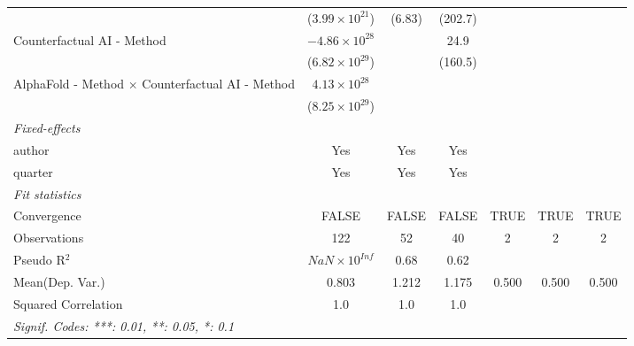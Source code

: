 \begin{tabular}{lcccccc}
                                                           & ($3.99\times 10^{21}$)  & (6.83)      & (202.7)      &      &      &   \\   
   Counterfactual AI - Method                              & $-4.86\times 10^{28}$   &             & 24.9         &      &      &   \\   
                                                           & ($6.82\times 10^{29}$)  &             & (160.5)      &      &      &   \\   
   AlphaFold - Method $\times$ Counterfactual AI - Method  & $4.13\times 10^{28}$    &             &              &      &      &   \\   
                                                           & ($8.25\times 10^{29}$)  &             &              &      &      &   \\   
   \midrule
   \emph{Fixed-effects}\\
   author                                                  & Yes                     & Yes         & Yes          &      &      & \\  
   quarter                                                 & Yes                     & Yes         & Yes          &      &      & \\  
   \midrule
   \emph{Fit statistics}\\
   Convergence                                             &FALSE                    & FALSE       & FALSE        & TRUE & TRUE & TRUE\\  
   Observations                                            & 122                     & 52          & 40           & 2    & 2    & 2\\  
   Pseudo R$^2$                                            & $NaN\times 10^{Inf}$    & 0.68        & 0.62         &      &      & \\  
Mean(Dep. Var.) & 0.803 & 1.212 & 1.175 & 0.500 & 0.500 & 0.500 \\
   Squared Correlation                                     & 1.0                     & 1.0         & 1.0          &      &      & \\  
   \midrule \midrule
   \multicolumn{7}{l}{\emph{Signif. Codes: ***: 0.01, **: 0.05, *: 0.1}}\\
\end{tabular}
\par\endgroup
